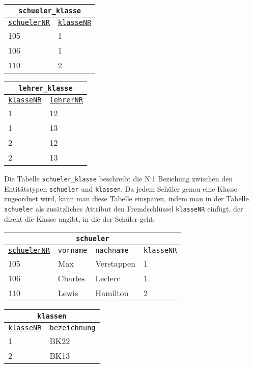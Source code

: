\begin{minipage}{\textwidth}
	\begin{minipage}{0.5\textwidth}
		\begin{tabular}{ll}
			\multicolumn{2}{c}{\lstinline!schueler_klasse!}\\
			\hline
			\underline{\lstinline!schuelerNR!}&\underline{\lstinline!klasseNR!}\\
			\hline
			105&1\\
			106&1\\
			110&2\\
		\end{tabular}
	\end{minipage}%
	\begin{minipage}{0.5\textwidth}
		\begin{tabular}{ll}
			\multicolumn{2}{c}{\lstinline!lehrer_klasse!}\\
			\hline
			\underline{\lstinline!klasseNR!}&\underline{\lstinline!lehrerNR!}\\
			\hline
			1&12\\
			1&13\\
			2&12\\
			2&13\\
		\end{tabular}
	\end{minipage}%
\end{minipage}
Die Tabelle \lstinline!schueler_klasse! beschreibt die N:1 Beziehung zwischen den Entitätstypen \lstinline!schueler! und \lstinline!klassen!. Da jedem Schüler genau eine Klasse zugeordnet wird, kann man diese Tabelle einsparen, indem man in der Tabelle \lstinline!schueler! als zusätzliches Attribut den Fremdschlüssel \lstinline!klasseNR! einfügt, der direkt die Klasse angibt, in die der Schüler geht:
\begin{minipage}{\textwidth}
	\begin{minipage}{0.6\textwidth}
		\begin{tabular}{llll}
			\multicolumn{4}{c}{\lstinline!schueler!}\\
			\hline
			\underline{\lstinline!schuelerNR!}&\lstinline!vorname!&\lstinline!nachname!&\lstinline!klasseNR!\\
			\hline
			105&Max&Verstappen&1\\
			106&Charles&Leclerc&1\\
			110&Lewis&Hamilton&2\\
		\end{tabular}
	\end{minipage}%
	\begin{minipage}{0.4\textwidth}
		\begin{tabular}{ll}
			\multicolumn{2}{c}{\lstinline!klassen!}\\
			\hline
			\underline{\lstinline!klasseNR!}&\lstinline!bezeichnung!\\
			\hline
			1&BK22\\
			2&BK13\\
		\end{tabular}
	\end{minipage}%
\end{minipage}
